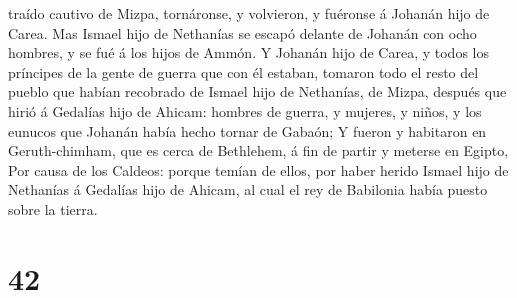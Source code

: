 traído cautivo de Mizpa, tornáronse, y volvieron, y fuéronse á Johanán
hijo de Carea.  Mas Ismael hijo de Nethanías se escapó
delante de Johanán con ocho hombres, y se fué á los hijos de Ammón.
 Y Johanán hijo de Carea, y todos los príncipes de la
gente de guerra que con él estaban, tomaron todo el resto del pueblo que
habían recobrado de Ismael hijo de Nethanías, de Mizpa, después que
hirió á Gedalías hijo de Ahicam: hombres de guerra, y mujeres, y niños,
y los eunucos que Johanán había hecho tornar de Gabaón; 
Y fueron y habitaron en Geruth-chimham, que es cerca de Bethlehem, á fin
de partir y meterse en Egipto,  Por causa de los Caldeos:
porque temían de ellos, por haber herido Ismael hijo de Nethanías á
Gedalías hijo de Ahicam, al cual el rey de Babilonia había puesto sobre
la tierra.

\hypertarget{section-41}{%
\section{42}\label{section-41}}

